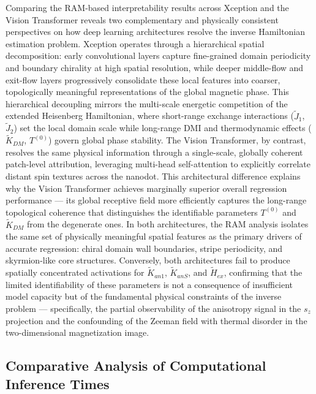 \documentclass[a4paper,fleqn]{cas-sc}
\begin{document}
Comparing the RAM-based interpretability results 
across Xception and the Vision Transformer reveals 
two complementary and physically consistent 
perspectives on how deep learning architectures 
resolve the inverse Hamiltonian estimation problem. 
Xception operates through a hierarchical spatial 
decomposition: early convolutional layers capture 
fine-grained domain periodicity and boundary 
chirality at high spatial resolution, while deeper 
middle-flow and exit-flow layers progressively 
consolidate these local features into coarser, 
topologically meaningful representations of the 
global magnetic phase. This hierarchical decoupling 
mirrors the multi-scale energetic competition of the 
extended Heisenberg Hamiltonian, where short-range 
exchange interactions ($\tilde{J}_1$, $\tilde{J}_2$) 
set the local domain scale while long-range DMI 
and thermodynamic effects ($\tilde{K}_{DM}$, 
$T^{(0)}$) govern global phase stability. The Vision 
Transformer, by contrast, resolves the same physical 
information through a single-scale, globally coherent 
patch-level attribution, leveraging multi-head 
self-attention to explicitly correlate distant spin 
textures across the nanodot. This architectural 
difference explains why the Vision Transformer 
achieves marginally superior overall regression 
performance --- its global receptive field more 
efficiently captures the long-range topological 
coherence that distinguishes the identifiable 
parameters $T^{(0)}$ and $\tilde{K}_{DM}$ from 
the degenerate ones. In both architectures, the 
RAM analysis isolates the same set of physically 
meaningful spatial features as the primary drivers 
of accurate regression: chiral domain wall 
boundaries, stripe periodicity, and skyrmion-like 
core structures. Conversely, both architectures 
fail to produce spatially concentrated activations 
for $\tilde{K}_{an1}$, $\tilde{K}_{anS}$, and 
$\tilde{H}_{ex}$, confirming that the limited 
identifiability of these parameters is not a 
consequence of insufficient model capacity but of 
the fundamental physical constraints of the inverse 
problem --- specifically, the partial observability 
of the anisotropy signal in the $s_z$ projection 
and the confounding of the Zeeman field with 
thermal disorder in the two-dimensional 
magnetization image.




\subsection{Comparative Analysis of Computational 
Inference Times}
\label{sec:inference_times}
\end{document}
